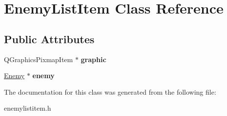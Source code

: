 \hypertarget{classEnemyListItem}{
\section{EnemyListItem Class Reference}
\label{classEnemyListItem}
}
\subsection*{Public Attributes}
\begin{DoxyCompactItemize}
\item 
\hypertarget{classEnemyListItem_a75abf62fb3c6841cccae377d61874f3e}{
QGraphicsPixmapItem $\ast$ {\bfseries graphic}}
\label{classEnemyListItem_a75abf62fb3c6841cccae377d61874f3e}

\item 
\hypertarget{classEnemyListItem_a9883c55a9130a2f83747950e3b3d87e7}{
\hyperlink{classEnemy}{Enemy} $\ast$ {\bfseries enemy}}
\label{classEnemyListItem_a9883c55a9130a2f83747950e3b3d87e7}

\end{DoxyCompactItemize}


The documentation for this class was generated from the following file:\begin{DoxyCompactItemize}
\item 
enemylistitem.h\end{DoxyCompactItemize}
